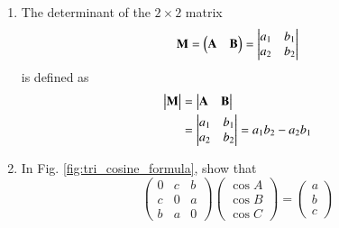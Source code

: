 \begin{enumerate}[label=\thesection.\arabic*.,ref=\thesection.\theenumi]
\item The determinant of the $2 \times 2$ matrix 
\begin{align}  
  \mathbf{M} = \begin{pmatrix}\mathbf{A} & \mathbf{B}\end{pmatrix}=\begin{vmatrix}a_1 & b_1\\a_2 & b_2\end{vmatrix}
\end{align}
is defined as
\begin{align}
  \label{eq:det2d}
  \begin{vmatrix}\mathbf{M}\end{vmatrix} &= \begin{vmatrix}\mathbf{A} & \mathbf{B}\end{vmatrix} 
  \\
  &= \begin{vmatrix}a_1 & b_1\\a_2 & b_2\end{vmatrix} = a_1b_2 - a_2 b_1
\end{align}
%
\iffalse
\item Let 
\begin{align}
  \vec{A} = \myvec{a_1\\a_2 \\ a_3},\, 
  \vec{B} = \myvec{b_1\\b_2 \\ b_3},\,
  \vec{C} = \myvec{c_1\\c_2 \\ c_3}
\end{align}
and 
\begin{align}
  \vec{A}_{ij} = \myvec{a_i\\a_j}, \,
  \vec{B}_{ij} = \myvec{b_i\\b_j}, \,
  \vec{C}_{ij} = \myvec{c_i\\c_j}. 
\end{align}
Then, \begin{align}  
	\mydet{\vec{A} & \vec{B} & \vec{C}} = a_1 \mydet{\vec{B}_{23} & \vec{C}_23} +a_2 \mydet{\vec{C}_{23} & \vec{A}_{23}} +a_3\mydet{\vec{A}_{23} & \vec{B}_{23}} 
\end{align}
\fi

\item
In Fig. \ref{fig:tri_cosine_formula}, show that
%
\begin{equation}
\label{eq:tri_cos_mat}
\begin{pmatrix}
0 & c & b \\
c & 0 & a \\
b & a & 0
\end{pmatrix}
\begin{pmatrix}
\cos A \\
\cos B \\
\cos C
\end{pmatrix}
= 
\begin{pmatrix}
a\\
b\\
c
\end{pmatrix}
\end{equation}
%
%
\begin{figure}[!ht]
	\begin{center}
		

\end{center}
\end{figure}
\end{enumerate}
